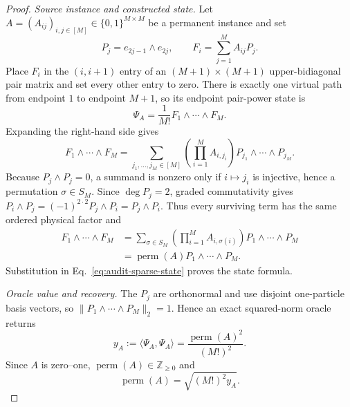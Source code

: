 \documentclass[aps,pra,reprint,superscriptaddress,nofootinbib,longbibliography,showkeys]{revtex4-2}
\theoremstyle{definition}
\newcommand{\perm}{\operatorname{perm}}
\begin{document}
\begin{proof}
\medskip\noindent\textit{Source instance and constructed state.}\quad
Let $A=(A_{ij})_{i,j\in[M]}\in\{0,1\}^{M\times M}$ be a permanent instance and
set
\begin{equation}
P_j=e_{2j-1}\wedge e_{2j},\qquad
F_i=\sum_{j=1}^{M}A_{ij}P_j.
\end{equation}
Place $F_i$ in the $(i,i+1)$ entry of an $(M+1)\times(M+1)$ upper-bidiagonal
pair matrix and set every other entry to zero.  There is exactly one virtual
path from endpoint $1$ to endpoint $M+1$, so its endpoint pair-power state is
\begin{equation}
\Psi_A=\frac{1}{M!}F_1\wedge\cdots\wedge F_M.
\label{eq:audit-sparse-state}
\end{equation}
Expanding the right-hand side gives
\begin{equation}
F_1\wedge\cdots\wedge F_M
=\sum_{j_1,\ldots,j_M\in[M]}
\left(\prod_{i=1}^{M}A_{i,j_i}\right)
P_{j_1}\wedge\cdots\wedge P_{j_M}.
\label{eq:audit-sparse-expand}
\end{equation}
Because $P_j\wedge P_j=0$, a summand is nonzero only if
$i\mapsto j_i$ is injective, hence a permutation $\sigma\in S_M$.  Since
$\deg P_j=2$, graded commutativity gives
$P_i\wedge P_j=(-1)^{2\cdot2}P_j\wedge P_i=P_j\wedge P_i$.  Thus every
surviving term has the same ordered physical factor and
\begin{align}
F_1\wedge\cdots\wedge F_M
&=\sum_{\sigma\in S_M}\left(\prod_{i=1}^{M}A_{i,\sigma(i)}\right)
P_1\wedge\cdots\wedge P_M\nonumber\\
&=\perm(A)P_1\wedge\cdots\wedge P_M.
\end{align}
Substitution in Eq.~\eqref{eq:audit-sparse-state} proves the state formula.

\medskip\noindent\textit{Oracle value and recovery.}\quad
The $P_j$ are orthonormal and use disjoint one-particle basis vectors, so
$\|P_1\wedge\cdots\wedge P_M\|_2=1$.  Hence an exact squared-norm oracle
returns
\begin{equation}
y_A:=\langle\Psi_A,\Psi_A\rangle
=\frac{\perm(A)^2}{(M!)^2}.
\end{equation}
Since $A$ is zero--one, $\perm(A)\in\mathbb Z_{\ge0}$ and
\begin{equation}
\perm(A)=\sqrt{(M!)^2y_A}.
\end{equation}


\end{proof}
\end{document}
